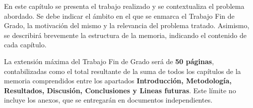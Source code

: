 

En este capítulo se presenta el trabajo realizado y se contextualiza el problema abordado. 
Se debe indicar el ámbito en el que se enmarca el Trabajo Fin de Grado, la motivación del mismo 
y la relevancia del problema tratado. 
Asimismo, se describirá brevemente la estructura de la memoria, indicando el contenido de cada capítulo.

La extensión máxima del Trabajo Fin de Grado será de \textbf{50 páginas}, contabilizadas como el total resultante de la suma de todos los capítulos de la memoria comprendidos entre los apartados \textbf{Introducción, Metodología, Resultados, Discusión, Conclusiones y Lineas futuras}. 
Este límite no incluye los anexos, que se entregarán en documentos independientes.